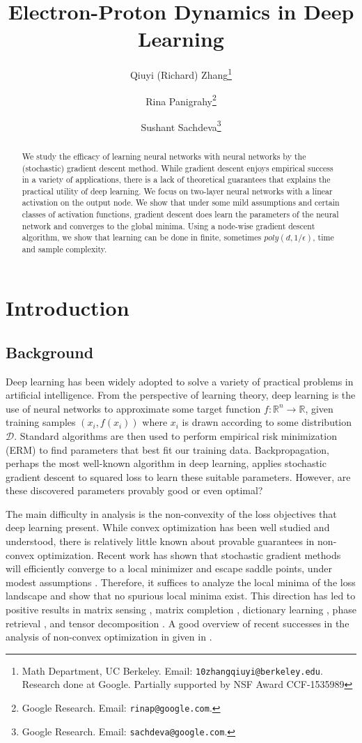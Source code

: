 \documentclass[11pt]{article}
\author{
}
\title{Electron-Proton Dynamics in Deep Learning}
\author{Qiuyi (Richard) Zhang\thanks{Math Department, UC Berkeley. Email: {\tt 10zhangqiuyi@berkeley.edu}. Research done at Google. Partially supported by NSF Award CCF-1535989}\and Rina Panigrahy\thanks{Google Research. Email: {\tt rinap@google.com}.} \and Sushant Sachdeva\thanks{Google Research. Email: {\tt sachdeva@google.com}.} }
\newcommand{\R}{{\mathbb{R}}}
\begin{document}
\maketitle

\begin{abstract}
We study the efficacy of learning neural networks with neural networks by the (stochastic) gradient descent method. While gradient descent enjoys empirical success in a variety of applications, there is a lack of theoretical guarantees that explains the practical utility of deep learning. We focus on two-layer neural networks with a linear activation on the output node. We show that under some mild assumptions and certain classes of activation functions, gradient descent does learn the parameters of the neural network and converges to the global minima. Using a node-wise gradient descent algorithm, we show that learning can be done in finite, sometimes $poly(d,1/\epsilon)$, time and sample complexity.
\end{abstract}




\section{Introduction}

\subsection{Background}
Deep learning has been widely adopted to solve a variety of practical problems in artificial intelligence. From the perspective of learning theory, deep learning is the use of neural networks to approximate some target function $f: \R^n \to \R$, given training samples $(x_i,f(x_i))$ where $x_i$ is drawn according to some distribution $\mathcal{D}$. Standard algorithms are then used to perform empirical risk minimization (ERM) to find parameters that best fit our training data. Backpropagation, perhaps the most well-known algorithm in deep learning, applies stochastic gradient descent to squared loss to learn these suitable parameters. However, are these discovered parameters provably good or even optimal? 

The main difficulty in analysis is the non-convexity of the loss objectives that deep learning present. While convex optimization has been well studied and understood, there is relatively little known about provable guarantees in non-convex optimization. Recent work has shown that stochastic gradient methods will efficiently converge to a local minimizer and escape saddle points, under modest assumptions \cite{GeHJY15}. Therefore, it suffices to analyze the local minima of the loss landscape and show that no spurious local minima exist. This direction has led to positive results in matrix sensing \cite{ParkKCS16a}, matrix completion \cite{GeLM16}, dictionary learning \cite{SunQW15}, phase retrieval \cite{SunQW16}, and tensor decomposition \cite{GeHJY15}. A good overview of recent successes in the analysis of non-convex optimization in given in \cite{SunQW15a}.
\end{document}
